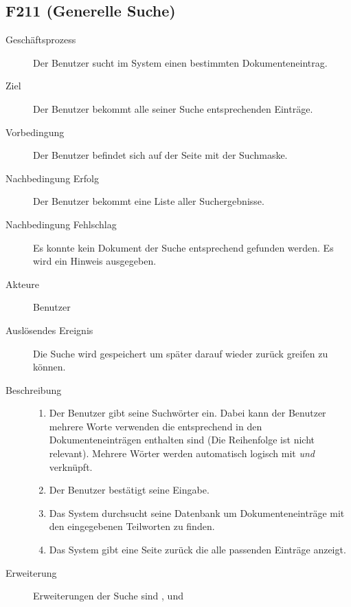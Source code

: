 \subsection{F211 (Generelle Suche)}
\label{F:Suche}
\begin{description}
  \item[Geschäftsprozess]Der Benutzer sucht im System einen bestimmten Dokumenteneintrag.
  \item[Ziel]Der Benutzer bekommt alle seiner Suche entsprechenden Einträge.
  \item[Vorbedingung]Der Benutzer befindet sich auf der Seite mit der Suchmaske.
  \item[Nachbedingung Erfolg]Der Benutzer bekommt eine Liste aller Suchergebnisse.
  \item[Nachbedingung Fehlschlag]Es konnte kein Dokument der Suche entsprechend gefunden werden. Es wird ein Hinweis ausgegeben.
  \item[Akteure]Benutzer
  \item[Auslösendes Ereignis]Die Suche wird gespeichert um später darauf wieder zurück greifen zu können.
  \item[Beschreibung]\hfill
    \begin{enumerate}
      \item Der Benutzer gibt seine Suchwörter ein. Dabei kann der Benutzer mehrere Worte verwenden die entsprechend in den Dokumenteneinträgen enthalten sind (Die Reihenfolge ist nicht relevant). Mehrere Wörter werden automatisch logisch mit \emph{und} verknüpft.
      \item Der Benutzer bestätigt seine Eingabe.
      \item Das System durchsucht seine Datenbank um Dokumenteneinträge mit den eingegebenen Teilworten zu finden.
      \item Das System gibt eine Seite zurück die alle passenden Einträge anzeigt.
    \end{enumerate}
    \item[Erweiterung]Erweiterungen der Suche sind ,  und 
\end{description}


